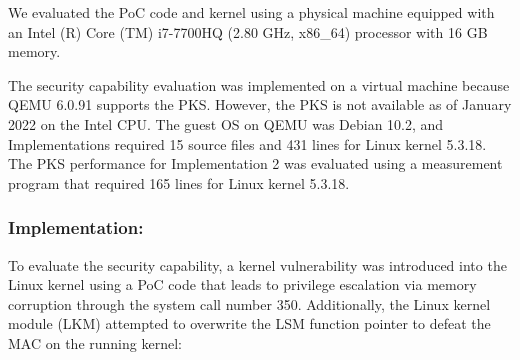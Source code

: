 %
We evaluated the PoC code and kernel using a physical machine equipped with an
Intel (R) Core (TM) i7-7700HQ (2.80 GHz, x86\_64) processor with 16 GB memory.
%
%

The security capability evaluation was implemented on a virtual machine because
QEMU 6.0.91 supports the PKS. However, the PKS is not available as of January
2022 on the Intel CPU.
%
The guest OS on QEMU was Debian 10.2, and Implementations required 15 source
files and 431 lines for Linux kernel 5.3.18.
%
The PKS performance for Implementation 2 was evaluated using a
measurement program that required 165 lines for Linux kernel 5.3.18.



\subsubsection{Implementation:}
%
%
To evaluate the security capability, a kernel vulnerability was introduced into
the Linux kernel using a PoC code \cite{CVE-2017-6074} that leads to privilege
escalation via memory corruption through the system call number 350.
%
Additionally, the Linux kernel module (LKM) attempted to overwrite the LSM function pointer to
defeat the MAC on the running kernel:

